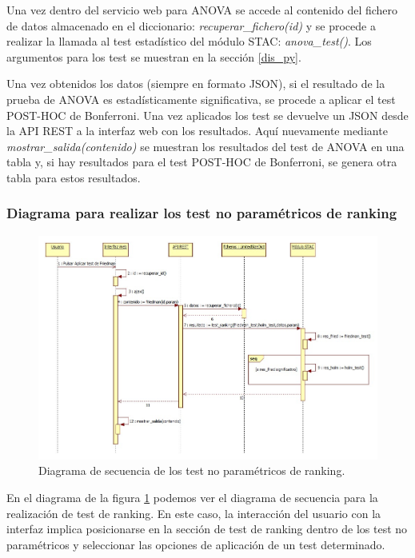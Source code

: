 Una vez dentro del servicio web para ANOVA se accede al contenido del fichero de datos almacenado en el diccionario: \textit{recuperar\_fichero(id)} y se procede a realizar la llamada al test estadístico del módulo STAC: \textit{anova\_test()}. Los argumentos para los test se muestran en la sección \ref{dis_py}.

Una vez obtenidos los datos (siempre en formato JSON), si el resultado de la prueba de ANOVA es estadísticamente significativa, se procede a aplicar el test POST-HOC de Bonferroni. Una vez aplicados los test se devuelve un JSON desde la API REST a la interfaz web con los resultados. Aquí nuevamente mediante \textit{mostrar\_salida(contenido)} se muestran los resultados del test de ANOVA en una tabla y, si hay resultados para el test POST-HOC de Bonferroni, se genera otra tabla para estos resultados.

\subsubsection{Diagrama para realizar los test no paramétricos de ranking}

\begin{figure}[H]
\centering
\begin{adjustwidth}{-5em}{-5em}
\includegraphics[scale=0.5]{figuras/sec_ranking.jpg}
\caption{Diagrama de secuencia de los test no paramétricos de ranking.}
\label{fig:sec_ranking}
\end{adjustwidth}
\end{figure}

En el diagrama de la figura \ref*{fig:sec_ranking} podemos ver el diagrama de secuencia para la realización de test de ranking. En este caso, la interacción del usuario con la interfaz implica posicionarse en la sección de test de ranking dentro de los test no paramétricos y seleccionar las opciones de aplicación de un test determinado.

